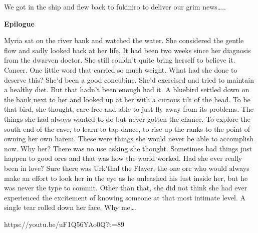 We got in the ship and flew back to fukiniro to deliver our grim news…..\medskip

\textbf{Epilogue}\medskip

Myria sat on the river bank and watched the water. She considered the gentle flow and sadly looked back at her life. It had been two weeks since her diagnosis from the dwarven doctor. She still couldn’t quite bring herself to believe it. Cancer. One little word that carried so much weight. What had she done to deserve this? She’d been a good concubine. She’d exercised and tried to maintain a healthy diet. But that hadn’t been enough had it. A bluebird settled down on the bank next to her and looked up at her with a curious tilt of the head. To be that bird, she thought, care free and able to just fly away from its problems. The things she had always wanted to do but never gotten the chance. To explore the south end of the cave, to learn to tap dance, to rise up the ranks to the point of owning her own harem. These were things she would never be able to accomplish now. Why her? There was no use asking she thought. Sometimes bad things just happen to good orcs and that was how the world worked. Had she ever really been in love? Sure there was Urk’thal the Flayer, the one orc who would always make an effort to look her in the eye as he unleashed his lust inside her, but he was never the type to commit. Other than that, she did not think she had ever experienced the excitement of knowing someone at that most intimate level. A single tear rolled down her face. Why me….\medskip

https://youtu.be/uF1Q56YAo0Q?t=89\medskip





%

\clearpage